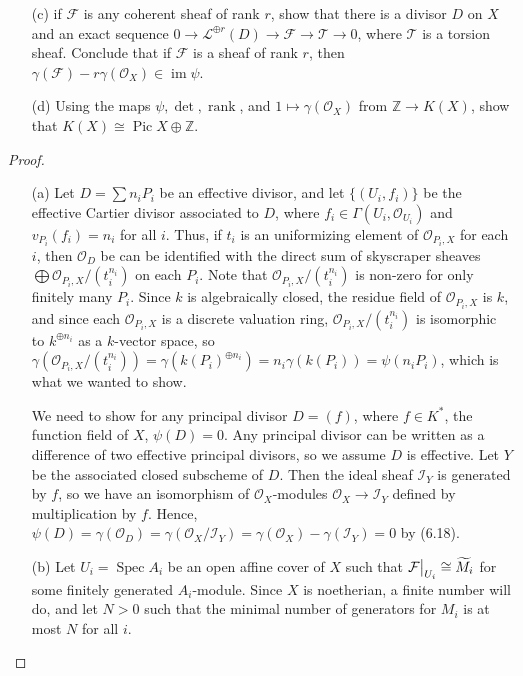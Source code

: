 \documentclass{article}
\newcommand{\fF}{\mathcal{F}}
\newcommand{\fO}{\mathcal{O}}
\newcommand{\fL}{\mathcal{L}}
\newcommand{\fI}{\mathcal{I}}
\newcommand{\Z}{\mathbb{Z}}
\DeclareMathOperator{\rk}{rank}
\DeclareMathOperator{\pic}{Pic}
\DeclareMathOperator{\im}{im}
\DeclareMathOperator{\spec}{Spec}
\newcommand\restr[2]{{%
  \left.\kern-\nulldelimiterspace %
  #1 %
  \vphantom{\big|} %
  \right|_{#2} %
}}
\begin{document}
\begin{enumerate} [label=\textbf{\arabic*.}, leftmargin=0em]
\begin{itemize}
    \item[(c)] if $\fF$ is any coherent sheaf of rank $r$, show that there is a divisor $D$ on $X$ and an exact sequence $0 \to \fL^{\oplus r}(D) \to \fF \to \mathcal{T} \to 0$, where $\mathcal{T}$ is a torsion sheaf. Conclude that if $\fF$ is a sheaf of rank $r$, then $\gamma(\fF) - r \gamma(\fO_X) \in \im \psi$.

    \item[(d)] Using the maps $\psi, \det, \rk$, and $1 \mapsto \gamma(\fO_X)$ from $\Z \to K(X)$, show that $K(X) \cong \pic X \oplus \Z$. 
\end{itemize}

\begin{proof} $ $ \vspace{0pt}
\begin{itemize}
\item[(a)] Let $D = \sum n_i P_i$ be an effective divisor, and let $\{ (U_i, f_i) \}$ be the effective Cartier divisor associated to $D$, where $f_i \in \Gamma(U_i, \fO_{U_i})$ and $v_{P_i}(f_i) = n_i$ for all $i$. Thus, if $t_i$ is an uniformizing element of $\fO_{P_i, X}$ for each $i$, then $\fO_D$ be can be identified with the direct sum of skyscraper sheaves $\bigoplus \fO_{P_i, X} / (t_i^{n_i})$ on each $P_i$. Note that $ \fO_{P_i, X} / (t_i^{n_i})$ is non-zero for only finitely many $P_i$. Since $k$ is algebraically closed, the residue field of $\fO_{P_i, X}$ is $k$, and since each $\fO_{P_i, X}$ is a discrete valuation ring, $\fO_{P_i, X} / (t_i^{n_i})$ is isomorphic to $k^{\oplus n_i}$ as a $k$-vector space, so $\gamma(\fO_{P_i, X}/(t_i^{n_i})) = \gamma(k(P_i)^{\oplus n_i}) = n_i \gamma(k(P_i)) = \psi(n_iP_i)$, which is what we wanted to show. 

We need to show for any principal divisor $D = (f)$, where $f \in K^*$, the function field of $X$, $\psi(D) = 0$. Any principal divisor can be written as a difference of two effective principal divisors, so we assume $D$ is effective. Let $Y$ be the associated closed subscheme of $D$. Then the ideal sheaf $\fI_Y$ is generated by $f$, so we have an isomorphism of $\fO_X$-modules $\fO_X \to \fI_Y$ defined by multiplication by $f$. Hence, $\psi(D) = \gamma(\fO_D) = \gamma(\fO_X / \fI_Y) = \gamma(\fO_X) - \gamma(\fI_Y) = 0$ by (6.18).

\item[(b)] Let $U_i = \spec{A_i}$ be an open affine cover of $X$ such that $\restr{\fF}{U_i} \cong \widetilde{M}_i$ for some finitely generated $A_i$-module. Since $X$ is noetherian, a finite number will do, and let $N > 0$ such that the minimal number of generators for $M_i$ is at most $N$ for all $i$.


\end{itemize}
\end{proof}
\end{enumerate}
\end{document}
